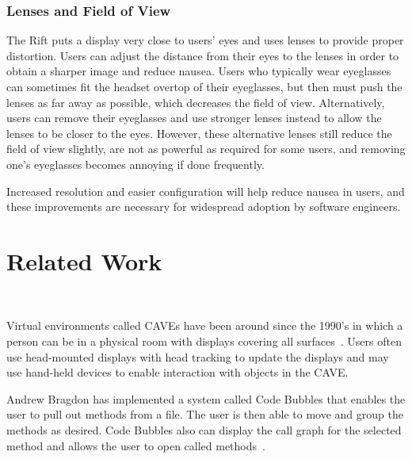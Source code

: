 \documentclass[conference]{IEEEtran}
\begin{document}
\subsubsection{Lenses and Field of View}
The Rift puts a display very close to users' eyes and uses lenses to provide proper distortion.
Users can adjust the distance from their eyes to the lenses in order to obtain a sharper image and reduce nausea.
Users who typically wear eyeglasses can sometimes fit the headset overtop of their eyeglasses, but then must push the lenses as far away as possible, which decreases the field of view.
Alternatively, users can remove their eyeglasses and use stronger lenses instead to allow the lenses to be closer to the eyes.
However, these alternative lenses still reduce the field of view slightly, are not as powerful as required for some users, and removing one's eyeglasses becomes annoying if done frequently.

Increased resolution and easier configuration will help reduce nausea in users, and these improvements are necessary for widespread adoption by software engineers.



\section{Related Work}

\\


Virtual environments called CAVEs have been around since the 1990's in which a person can be in a physical room with displays covering all surfaces~\cite{Cruz-Neira:CAVE}.  
Users often use head-mounted displays with head tracking to update the displays and may use hand-held devices to enable interaction with objects in the CAVE.

Andrew Bragdon has implemented a system called Code Bubbles that enables the user to pull out methods from a file. 
The user is then able to move and group the methods as desired.  
Code Bubbles also can display the call graph for the selected method and allows the user to open called methods~\cite{Bragdon:CodeBubbles}.
\end{document}
